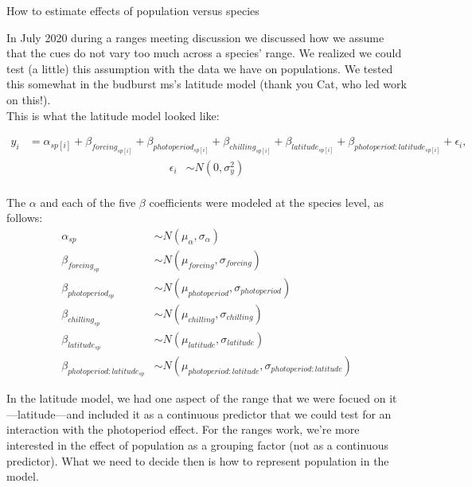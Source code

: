 \documentclass[11pt,letter]{article}
\begin{document}
 

\begin{center}
{\Large How to estimate effects of population versus species} %
\end{center}

In July 2020 during a ranges meeting discussion we discussed how we assume that the cues do not vary too much across a species' range. We realized we could test (a little) this assumption with the data we have on populations. We tested this somewhat in the budburst ms's latitude model (thank you Cat, who led work on this!). \\

This is what the latitude model looked like:

\begin{align*}
y_i &= \alpha_{sp[i]} + \beta_{forcing_{sp[i]}} + \beta_{photoperiod_{sp[i]}} + \beta_{chilling_{sp[i]}} + \beta_{latitude_{sp[i]}} + \beta_{photoperiod : latitude_{sp[i]}} + \epsilon_i,
\end{align*}
\begin{align*}
\epsilon_i & \sim N(0,\sigma^2_y) \\
\end{align*}

\noindent The $\alpha$ and each of the five $\beta$ coefficients were modeled at the species level, as follows:
\begin{align*}
\alpha_{sp} & \sim N(\mu_{\alpha}, \sigma_{\alpha}) \\
\beta_{forcing_{sp}} & \sim N(\mu_{forcing}, \sigma_{forcing}) \\
\beta_{photoperiod_{sp}} & \sim N(\mu_{photoperiod}, \sigma_{photoperiod})\\
\beta_{chilling_{sp}} & \sim N(\mu_{chilling}, \sigma_{chilling})\\
\beta_{latitude_{sp}} & \sim N(\mu_{latitude}, \sigma_{latitude})\\
\beta_{photoperiod : latitude_{sp}} & \sim N(\mu_{photoperiod : latitude}, \sigma_{photoperiod : latitude})
\end{align*}

In the latitude model, we had one aspect of the range that we were focued on it---latitude---and included it as a continuous predictor that we could test for an interaction with the photoperiod effect. For the ranges work, we're more interested in the effect of population as a grouping factor (not as a continuous predictor). What we need to decide then is how to represent population in the model. \\
\end{document}
